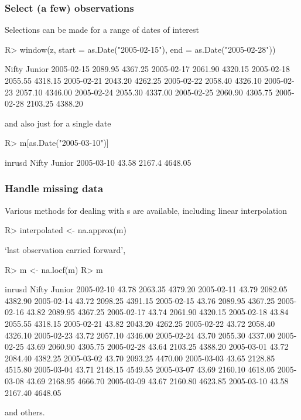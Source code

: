 \documentclass{Z}
\newcommand{\mysection}[1]{\subsubsection[#1]{\textbf{#1}}}
\begin{document}
\mysection{Select (a few) observations}

Selections can be made for a range of dates of interest
\begin{Schunk}
\begin{Sinput}
R> window(z, start = as.Date("2005-02-15"), end = as.Date("2005-02-28"))
\end{Sinput}
\begin{Soutput}
             Nifty  Junior
2005-02-15 2089.95 4367.25
2005-02-17 2061.90 4320.15
2005-02-18 2055.55 4318.15
2005-02-21 2043.20 4262.25
2005-02-22 2058.40 4326.10
2005-02-23 2057.10 4346.00
2005-02-24 2055.30 4337.00
2005-02-25 2060.90 4305.75
2005-02-28 2103.25 4388.20
\end{Soutput}
\end{Schunk}
and also just for a single date
\begin{Schunk}
\begin{Sinput}
R> m[as.Date("2005-03-10")]
\end{Sinput}
\begin{Soutput}
           inrusd  Nifty  Junior
2005-03-10  43.58 2167.4 4648.05
\end{Soutput}
\end{Schunk}

\mysection{Handle missing data}

Various methods for dealing with s are available, including
linear interpolation
\begin{Schunk}
\begin{Sinput}
R> interpolated <- na.approx(m)
\end{Sinput}
\end{Schunk}
`last observation carried forward',
\begin{Schunk}
\begin{Sinput}
R> m <- na.locf(m)
R> m
\end{Sinput}
\begin{Soutput}
           inrusd   Nifty  Junior
2005-02-10  43.78 2063.35 4379.20
2005-02-11  43.79 2082.05 4382.90
2005-02-14  43.72 2098.25 4391.15
2005-02-15  43.76 2089.95 4367.25
2005-02-16  43.82 2089.95 4367.25
2005-02-17  43.74 2061.90 4320.15
2005-02-18  43.84 2055.55 4318.15
2005-02-21  43.82 2043.20 4262.25
2005-02-22  43.72 2058.40 4326.10
2005-02-23  43.72 2057.10 4346.00
2005-02-24  43.70 2055.30 4337.00
2005-02-25  43.69 2060.90 4305.75
2005-02-28  43.64 2103.25 4388.20
2005-03-01  43.72 2084.40 4382.25
2005-03-02  43.70 2093.25 4470.00
2005-03-03  43.65 2128.85 4515.80
2005-03-04  43.71 2148.15 4549.55
2005-03-07  43.69 2160.10 4618.05
2005-03-08  43.69 2168.95 4666.70
2005-03-09  43.67 2160.80 4623.85
2005-03-10  43.58 2167.40 4648.05
\end{Soutput}
\end{Schunk}
and others.
\end{document}
